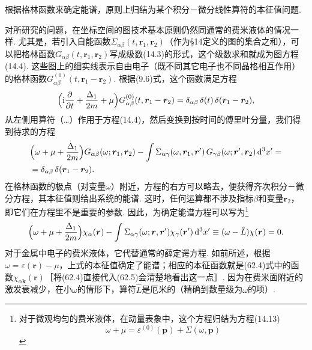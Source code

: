 根据格林函数来确定能谱，原则上归结为某个积分－微分线性算符的本征值问题.

对所研究的问题，在坐标空间的图技术基本原则仍然同通常的费米液体的情况一样. 尤其是，若引入自能函数$\Sigma_{\alpha\beta}(t,\bm{r}_1,\bm{r}_2)$（作为§14定义的图的集合之和），可以把格林函数$G_{\alpha\beta}(t,\bm{r}_1,\bm{r}_2)$写成级数(14.3)的形式，这个级数求和就成为图方程(14.4). 这些图上的细实线表示自由电子（既不同其它电子也不同晶格相互作用）的格林函数$G^{(0)}_{\alpha\beta}(t,\bm{r}_1-\bm{r}_2)$. 根据(9.6)式，这个函数满足方程
\begin{equation*}
\Bigl(\mathrm{i}\frac{\partial}{\partial t}+\frac{\Delta_1}{2m}+\mu\Bigr)
G^{(0)}_{\alpha\beta}(t,\bm{r}_1-\bm{r}_2)
=\delta_{\alpha\beta}\,\delta(t)\,\delta(\bm{r}_1-\bm{r}_2),
\end{equation*}
从左侧用算符（…）作用于方程(14.4)，然后变换到按时间的傅里叶分量，我们得到待求的方程
\begin{equation}
\begin{aligned}
&\Bigl(\omega+\mu+\frac{\Delta_1}{2m}\Bigr)G_{\alpha\beta}(\omega;\bm{r}_1,\bm{r}_2)
-\int\Sigma_{\alpha\gamma}(\omega,\bm{r}_1,\bm{r}')\,
G_{\gamma\beta}(\omega;\bm{r}',\bm{r}_2)\,\mathrm{d}^3x'=\\
&=\delta_{\alpha\beta}\,\delta(\bm{r}_1-\bm{r}_2).
\end{aligned}
\end{equation}
在格林函数的极点（对变量$\omega$）附近，方程的右方可以略去，便获得齐次积分－微分方程，其本征值则给出系统的能谱. 这时，任何运算都不涉及指标$\beta$和变量$\bm{r}_2$，即它们在方程里不是重要的参数. 因此，为确定能谱方程可以写为\footnote{对于微观均匀的费米液体，在动量表象中，这个方程归结为方程(14.13)
\begin{equation*}
\omega+\mu=\varepsilon^{(0)}(\bm p)+\Sigma(\omega,\bm p)
\end{equation*}}
\begin{equation}
\Bigl(\omega+\mu+\frac{\Delta_1}{2m}\Bigr)\chi_\alpha(\bm{r})
-\int\Sigma_{\alpha\gamma}(\omega;\bm{r},\bm{r}')\chi_\gamma(\bm{r}')\,\mathrm{d}^3x'
\equiv(\omega-\hat{L})\chi(\bm{r})=0.
\end{equation}
对于金属中电子的费米液体，它代替通常的薛定谔方程. 如前所述，根据$\omega=\varepsilon(\bm{r})-\mu$，上式的本征值确定了能谱；相应的本征函数就是(62.4)式中的函数$\chi_{\alpha\bm{k}}(\bm{r})$［将(62.4)直接代入(62.5)会清楚地看出这一点］. 因为在费米面附近的激发衰减少，在小$\omega$的情形下，算符$\hat{L}$是厄米的（精确到数量级为$\omega$的项）.

